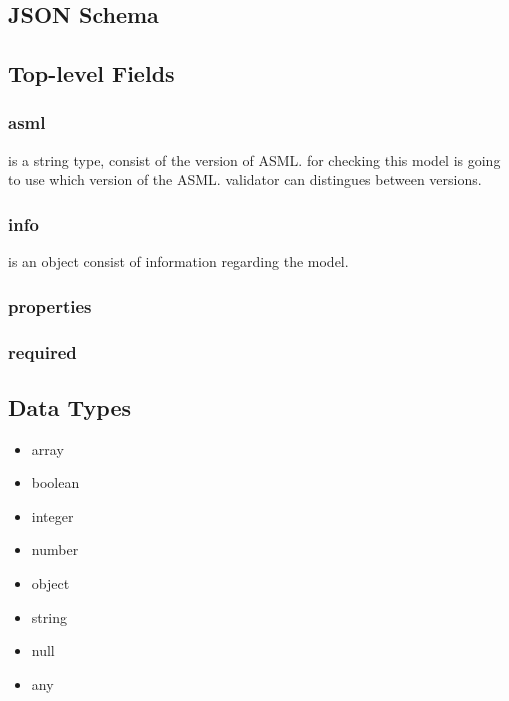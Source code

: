 \subsection{JSON Schema}
\subsection{Top-level Fields}
\subsubsection{asml}
is a string type, consist of the version of ASML. for checking this model is going to use which version of the ASML.
validator can distingues between versions. 

\subsubsection{info}
is an object consist of information regarding the model.
\subsubsection{properties}
\subsubsection{required}

\subsection{Data Types}


\begin{itemize}
\item array
\item boolean
\item integer
\item number
\item object
\item string
\item null
\item any
\end{itemize}

